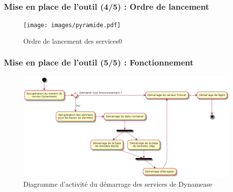 \begin{frame}
	\frametitle{Mise en place de l'outil (4/5) : Ordre de lancement}

    \begin{center}
	  \begin{figure}
        \texttt{[image: images/pyramide.pdf]}
	   \caption{Ordre de lancement des services0}
	  \end{figure}
	\end{center}
\end{frame}


\begin{frame}
	\frametitle{Mise en place de l'outil (5/5) : Fonctionnement}

    \begin{center}
	  \begin{figure}
        \includegraphics[scale=0.30]{images/activity_outil.png}
	   \caption{Diagramme d'activité du démarrage des services de Dynamease}
	  \end{figure}
	\end{center}

\end{frame}